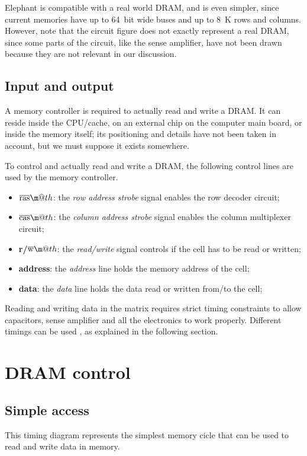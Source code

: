 \documentclass[a4paper,12pt]{article}
\makeatletter
\newcommand*{\textoverline}[1]{$\overline{\hbox{#1}}\m@th$}
\newcommand{\memoryname}{Elephant}
\makeatother
\begin{document}
\memoryname{} is compatible with a real world DRAM, and is even simpler, since current memories have up to 64~bit wide buses and up to 8~K rows and columns.
\\
However, note that the circuit figure does not exactly represent a real DRAM, since some parts of the circuit, like the sense amplifier, have not been drawn because they are not relevant in our discussion.

\subsection{Input and output}
A memory controller is required to actually read and write a DRAM.
It can reside inside the CPU/cache, on an external chip on the computer main board, or inside the memory itself; its positioning and details have not been taken in account, but we must suppose it exists somewhere.

To control and actually read and write a DRAM, the following control lines are used by the memory controller.

\begin{itemize}
  \item \textbf{\textoverline{ras}}: the \emph{row address strobe} signal enables the row decoder circuit;
  \item \textbf{\textoverline{cas}}: the \emph{column address strobe} signal enables the column multiplexer circuit;
  \item \textbf{r/\textoverline{w}}: the \emph{read/write} signal controls if the cell has to be read or written;
  \item \textbf{address}: the \emph{address} line holds the memory address of the cell;
  \item \textbf{data}: the \emph{data} line holds the data read or written from/to the cell;
\end{itemize}

Reading and writing data in the matrix requires strict timing constraints to allow capacitors, sense amplifier and all the electronics to work properly.
Different timings can be used \cite{bib:ibm}, as explained in the following section.

\section{DRAM control}

\subsection{Simple access} \label{sec:simple-access}
This timing diagram represents the simplest memory cicle that can be used to read and write data in memory.
\end{document}

